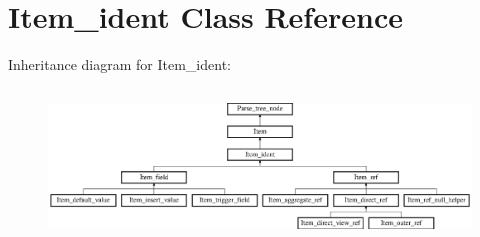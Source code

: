 \hypertarget{classItem__ident}{}\section{Item\+\_\+ident Class Reference}
\label{classItem__ident}
Inheritance diagram for Item\+\_\+ident\+:\begin{figure}[H]
\begin{center}
\leavevmode
\includegraphics[height=4.087591cm]{classItem__ident}
\end{center}
\end{figure}
